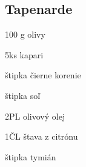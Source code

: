 \setcounter{step}{0}
\subsection{Tapenarde}

\begin{ingredient}
\begin{main}
	\item 100 g olivy 
	\item 5ks kapari
	\item štipka čierne korenie
	\item štipka soľ
	\item 2PL olivový olej
	\item 1ČL štava z citrónu
	\item štipka tymián
\end{main}
\end{ingredient}%
\begin{recipe}




\end{recipe}

\begin{notes}

\end{notes}	
